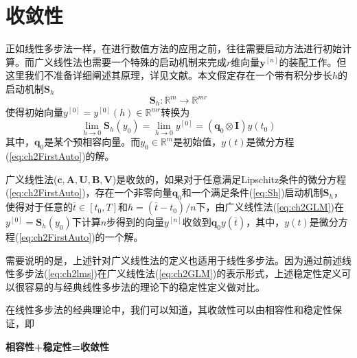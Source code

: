 \section{收敛性}
正如线性多步法一样，在进行数值方法的应用之前，往往需要启动方法进行初始计算。而广义线性法也需要一个特殊的启动机制来完成$r$维向量$\bm{y}^{[n]}$的装配工作。但这里我们不准备详细阐述其原理，详见文献。本文假定存在一个带有积分步长$h$的启动机制$\bm{S}_h$
\begin{equation}
\bm{S}_h:\mathbb{R}^{m}\to\mathbb{R}^{mr}
\end{equation}
使得初始向量$y^{[0]}=y^{[0]}(h)\in\mathbb{R}^{mr}$转换为
\begin{equation}
\lim_{h\to0}\bm{S}_h(y_0)=\lim_{h\to0}y^{[0]}=(\bm{q}_0\otimes\bm{I})y(t_0)\label{eq:Sh}
\end{equation}
其中，$\bm{q}_0$是某个预相容向量。而$y_0\in\mathbb{R}^m$是初始值，$y(t)$是微分方程(\ref{eq:ch2FirstAuto})的解。
\begin{definition}[收敛性定义]
广义线性法($\bm{c},\bm{A},\bm{U},\bm{B},\bm{V}$)是收敛的，如果对于任意满足Lipschitz条件的微分方程(\ref{eq:ch2FirstAuto})，存在一个非零向量$\bm{q}_0$和一个满足条件(\ref{eq:Sh})启动机制$\bm{S}_h$，使得对于任意的$\overline{t}\in[t_0,T]$和$h=(\overline{t}-t_0)/n$下，由广义线性法(\ref{eq:ch2GLM})在$y^{[0]}=\bm{S}_h(y_0)$下计算$n$步得到的向量$y^{[n]}$收敛到$\bm{q}_0y(\overline{t})$，其中，$y(t)$是微分方程(\ref{eq:ch2FirstAuto})的一个解。
\end{definition}
需要说明的是，上述针对广义线性法的定义也适用于线性多步法。因为通过前述线性多步法(\ref{eq:ch2lms})在广义线性法(\ref{eq:ch2GLM})的表示形式，上述稳定性定义可以很容易的与经典线性多步法的理论下的稳定性定义做对比。

在线性多步法的经典理论中，我们可以知道，其收敛性可以由相容性和稳定性保证，即
\begin{center}
\textbf{相容性+稳定性=收敛性 }
\end{center}

